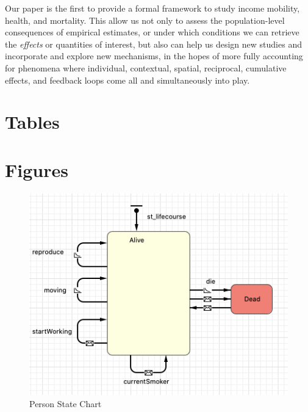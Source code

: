 \documentclass[class=article, crop=false, 12pt]{standalone}
\begin{document}
Our paper is the first to provide a formal framework to study income mobility, health, and mortality. This allow us not only to assess the population-level consequences of empirical estimates, or under which conditions we can retrieve the \textit{effects} or quantities of interest, but also can help us design new studies and incorporate and explore new mechanisms, in the hopes of more fully accounting for phenomena where individual, contextual, spatial, reciprocal, cumulative effects, and feedback loops come all and simultaneously into play.



\clearpage
\section{Tables}
%


\newpage


\newpage


\clearpage
\section{Figures}

\begin{figure}[htp]
    \caption{Person State Chart} \label{ch04:state_chart}
    \centering
        \includegraphics[scale=0.5]{plots/state_chart.png}
\end{figure}
\end{document}
